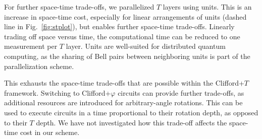\documentclass[prx,aps,letterpaper,twocolumn,allowfontchageintitle=true,accepted=2019-02-01]{quantumarticle}
\begin{document}
For further space-time trade-offs, we parallelized $T$ layers using units. This is an increase in space-time cost, especially for linear arrangements of units (dashed line in Fig.~\ref{fig:stplot}), but enables further space-time trade-offs. Linearly trading off space versus time, the computational time can be reduced to one measurement per $T$ layer. Units are well-suited for distributed quantum computing, as the sharing of Bell pairs between neighboring units is part of the parallelization scheme.

This exhausts the space-time trade-offs that are possible within the Clifford+$T$ framework. Switching to Clifford+$\varphi$ circuits can provide further trade-offs, as additional resources are introduced for arbitrary-angle rotations. This can be used to execute circuits in a time proportional to their rotation depth, as opposed to their $T$ depth. We have not investigated how this trade-off affects the space-time cost in our scheme.

\begin{table}[t]
\centering
{}
\caption{Space and time cost of the schemes plotted in Fig.~\ref{fig:stplot}. The number in parentheses are for linear arrangements of units (dashed lines in Fig.~\ref{fig:stplot}).}\label{tab:conclusion}
\end{table}
\end{document}
